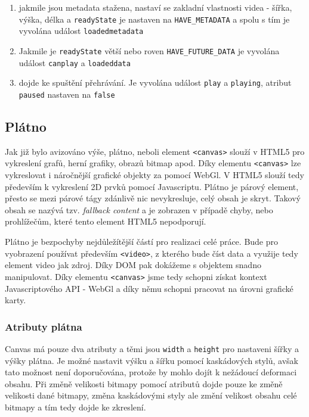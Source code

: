 \begin{description}
\begin{enumerate}
			\item jakmile jsou metadata stažena, nastaví se zakladní vlastnosti videa - šířka, výška, délka a \texttt{readyState} je nastaven na \texttt{HAVE\_METADATA} a spolu s tím je vyvolána událost \texttt{loadedmetadata}
			
			\item Jakmile je \texttt{readyState} větší nebo roven \texttt{HAVE\_FUTURE\_DATA} je vyvolána událost \texttt{canplay} a \texttt{loadeddata}
			
			\item dojde ke spuštění přehrávání. Je vyvolána událost \texttt{play} a \texttt{playing}, atribut \texttt{paused} nastaven na \texttt{false}
		\end{enumerate}
\end{description}


\newpage

\subsection{Plátno}

Jak již bylo avizováno výše, plátno, neboli element \texttt{<canvas>} slouží v HTML5 pro vykreslení grafů, herní grafiky, obrazů bitmap apod. Díky elementu \texttt{<canvas>} lze vykreslovat i náročnější grafické objekty za pomocí WebGl. V HTML5 slouží tedy především k vykreslení 2D prvků pomocí Javascriptu. Plátno je párový  element, přesto se mezi párové tágy zdánlivě nic nevykresluje, celý obsah je skryt. Takový obsah se nazývá tzv. \textit{fallback content} a je zobrazen v případě chyby, nebo prohlížečům, které tento element HTML5 nepodporují.

Plátno je bezpochyby nejdůležítější částí pro realizaci celé práce. Bude pro vyobrazení používat především \texttt{<video>}, z kterého bude číst data a využije tedy element video jak zdroj. Díky DOM pak dokážeme s objektem snadno manipulovat. Díky elementu \texttt{<canvas>} jsme tedy schopni získat kontext Javascriptového API - WebGl a díky němu schopni pracovat na úrovni grafické karty.

\subsubsection{Atributy plátna}
Canvas má pouze dva atributy a těmi jsou \texttt{width} a \texttt{height} pro nastaveni šířky a výšky plátna. Je možné nastavit výšku a šířku pomocí kaskádových stylů, avšak tato možnost není doporučována, protože by mohlo dojít k nežádoucí deformaci obsahu. Při změně velikosti bitmapy pomocí atributů dojde pouze ke změně velikosti dané bitmapy, změna kaskádovými styly ale změní velikost obsahu celé bitmapy a tím tedy dojde ke zkreslení.

